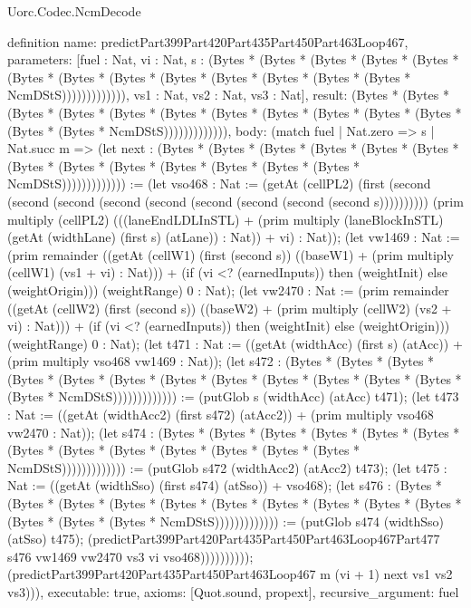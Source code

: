 \begin{lexlean}{Uorc.Codec.NcmDecode}
\begin{semanticmodule}
definition{
  name: predictPart399Part420Part435Part450Part463Loop467,
  parameters: [fuel : Nat, vi : Nat, s : (Bytes * (Bytes * (Bytes * (Bytes * (Bytes * (Bytes * (Bytes * (Bytes * (Bytes * (Bytes * (Bytes * (Bytes * (Bytes * NcmDStS))))))))))))), vs1 : Nat, vs2 : Nat, vs3 : Nat],
  result: (Bytes * (Bytes * (Bytes * (Bytes * (Bytes * (Bytes * (Bytes * (Bytes * (Bytes * (Bytes * (Bytes * (Bytes * (Bytes * NcmDStS))))))))))))),
  body: (match fuel
    | Nat.zero => s
    | Nat.succ m => (let next : (Bytes * (Bytes * (Bytes * (Bytes * (Bytes * (Bytes * (Bytes * (Bytes * (Bytes * (Bytes * (Bytes * (Bytes * (Bytes * NcmDStS))))))))))))) := (let vso468 : Nat := (getAt (cellPL2) (first (second (second (second (second (second (second (second (second (second s)))))))))) (prim multiply (cellPL2) (((laneEndLDLInSTL) + (prim multiply (laneBlockInSTL) (getAt (widthLane) (first s) (atLane)) : Nat)) + vi) : Nat)); (let vw1469 : Nat := (prim remainder ((getAt (cellW1) (first (second s)) ((baseW1) + (prim multiply (cellW1) (vs1 + vi) : Nat))) + (if (vi <? (earnedInputs)) then (weightInit) else (weightOrigin))) (weightRange) 0 : Nat); (let vw2470 : Nat := (prim remainder ((getAt (cellW2) (first (second s)) ((baseW2) + (prim multiply (cellW2) (vs2 + vi) : Nat))) + (if (vi <? (earnedInputs)) then (weightInit) else (weightOrigin))) (weightRange) 0 : Nat); (let t471 : Nat := ((getAt (widthAcc) (first s) (atAcc)) + (prim multiply vso468 vw1469 : Nat)); (let s472 : (Bytes * (Bytes * (Bytes * (Bytes * (Bytes * (Bytes * (Bytes * (Bytes * (Bytes * (Bytes * (Bytes * (Bytes * (Bytes * NcmDStS))))))))))))) := (putGlob s (widthAcc) (atAcc) t471); (let t473 : Nat := ((getAt (widthAcc2) (first s472) (atAcc2)) + (prim multiply vso468 vw2470 : Nat)); (let s474 : (Bytes * (Bytes * (Bytes * (Bytes * (Bytes * (Bytes * (Bytes * (Bytes * (Bytes * (Bytes * (Bytes * (Bytes * (Bytes * NcmDStS))))))))))))) := (putGlob s472 (widthAcc2) (atAcc2) t473); (let t475 : Nat := ((getAt (widthSso) (first s474) (atSso)) + vso468); (let s476 : (Bytes * (Bytes * (Bytes * (Bytes * (Bytes * (Bytes * (Bytes * (Bytes * (Bytes * (Bytes * (Bytes * (Bytes * (Bytes * NcmDStS))))))))))))) := (putGlob s474 (widthSso) (atSso) t475); (predictPart399Part420Part435Part450Part463Loop467Part477 s476 vw1469 vw2470 vs3 vi vso468)))))))))); (predictPart399Part420Part435Part450Part463Loop467 m (vi + 1) next vs1 vs2 vs3))),
  executable: true,
  axioms: [Quot.sound, propext],
  recursive_argument: fuel
}


\end{semanticmodule}
\end{lexlean}
